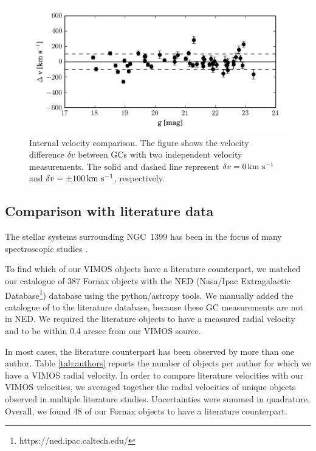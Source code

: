 \documentclass[useAMS,usenatbib]{mn2e}
\newcommand{\kms}{\mbox{\,km~s$^{-1}$}}
\begin{document}
\begin{figure}
\centering
\includegraphics[width=\columnwidth]{figures/internal.png} 
\caption{Internal velocity comparison. The figure shows the velocity difference 
$\delta v$ between GCs with two independent velocity measurements. The solid 
and dashed line represent $\delta v = 0 \kms$ and $\delta v = \pm 100 \kms$, 
respectively. }
\label{fig:internal}
\end{figure}

\subsection{Comparison with literature data}

The stellar systems surrounding NGC~1399 has been in the focus of many 
spectroscopic studies
\citep{Dirsch04, Schuberth, Bergond07, Firth07, Chilingarian11, Mieske04, 
Hilker07, Francis12, Drinkwater00}.

To find which of our VIMOS objects have a literature counterpart, we matched 
our catalogue of 387 Fornax objects with the NED (Nasa/Ipac Extragalactic 
Database\footnote{https://ned.ipac.caltech.edu/}) database using the 
python/astropy tools. 
We manually added the catalogue of \citet{Schuberth} to the literature 
database, because these GC measurements are not in NED. We required the 
literature objects to have a measured radial velocity and to be within 0.4 
arcsec from our VIMOS source. 

In most cases, the literature counterpart has been observed by more than one 
author. Table \ref{tab:authors} reports the number of objects per author for 
which we have a VIMOS radial velocity. 
In order to compare literature velocities with our VIMOS velocities, we 
averaged together the radial velocities of unique objects observed in multiple 
literature studies. Uncertainties were summed in quadrature. 
Overall, we found 48 of our Fornax objects to have a literature counterpart. 
\end{document}
